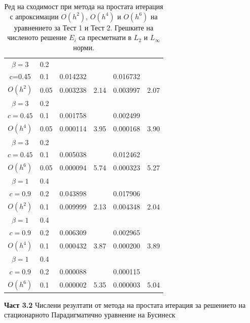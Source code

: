 \documentclass[a5paper]{article}
\theoremstyle{remark}
\begin{document}
\begin{normalsize}
\begin{table}[ht]
\begin{footnotesize}
\begin{tabular}{||c|l|ll|ll||}
$\beta = 3$ 	&0.2    										&            &            &           &   \\
      c=0.45 	&0.1    & 0.014232  						&            & 0.016732 			&   \\
   $O(h^2)$     &0.05   & 0.003238  						&2.14  & 0.003997					& 2.07 \\
\hline 
$\beta = 3$   	&0.2   &            &            &             &    \\
      $c=0.45 $ &0.1   &   0.001758   &           &  0.002499  &   \\
       $O(h^4)$	&0.05  &  0.000114 & 3.95    & 0.000168  & 3.90  \\
\hline
$\beta = 3$   	&0.2   &            &        &                  &      \\
   $c=0.45$   	&0.1   &  0.005038 &           & 0.012462       &       \\
     $O(h^6)$	&0.05  &  0.000094  & 5.74  &  0.000323 & 5.27         \\
			\hline
			\hline 	
$\beta = 1$   	&0.4   &             &           &                & \\
     $c=0.9$     &0.2   &  0.043898  &             & 0.017906      &    \\
     $O(h^2)$	&0.1  & 0.009999 & 2.13       & 0.004348      & 2.04  \\
\hline 	
 $\beta = 1$   	&0.4  &            &               &               &     \\
     $c=0.9$  	&0.2   & 0.006309  &              & 0.002965      &        \\
     $O(h^4)$	&0.1  &  0.000432 &3.87        & 0.000200 &  3.89        \\
    \hline
 $\beta = 1$	&0.4   &             &        &               &        \\
   $ c=0.9$  	&0.2   &  0.000088  &        & 0.000115      &       \\
       $O(h^6)$	&0.1  &   0.000002 &5.35  & 0.000003 &   5.04       \\
	   \hline
			\hline 
		\end{tabular}
		\caption{\normalsize Ред на сходимост при метода на простата итерация с апроксимации $O(h^{2})$, $O(h^{4})$ и $O(h^{6})$ на уравнението за Тест  1 и Тест 2. Грешките на численото решение $E_i$ са пресметнати в $L_2$ и $L_\infty$ норми.}
\label{tab:a}
\end{footnotesize}
\end{table}
\FloatBarrier

\textbf{Част 3.2} Числени резултати от метода на простата итерация за решението на стационарното Парадигматично уравнение на Бусинеск


\end{normalsize}
\end{document}
